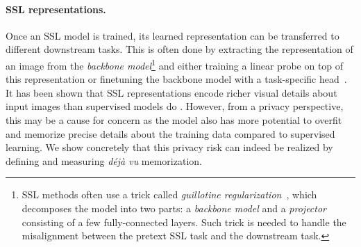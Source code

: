 \paragraph{SSL representations.} Once an SSL model is trained, its learned representation can be transferred to different downstream tasks. This is often done by extracting the representation of an image from the \emph{backbone model}\footnote{SSL methods often use a trick called \emph{guillotine regularization}~\citep{Guillotine}, which decomposes the model into two parts: a \emph{backbone model} and a \emph{projector} consisting of a few fully-connected layers. Such trick is needed to handle the misalignment between the pretext SSL task and the downstream task.} and either training a linear probe on top of this representation or finetuning the backbone model with a task-specific head~\citep{Guillotine}.
It has been shown that SSL representations encode richer visual details about input images than supervised models do \cite{RCDM}. However, from a privacy perspective, this may be a cause for concern as the model also has more potential to overfit and memorize precise details about the training data compared to supervised learning. We show concretely that this privacy risk can indeed be realized by defining and measuring \emph{déjà vu} memorization.
\vspace{-0.5em} 
